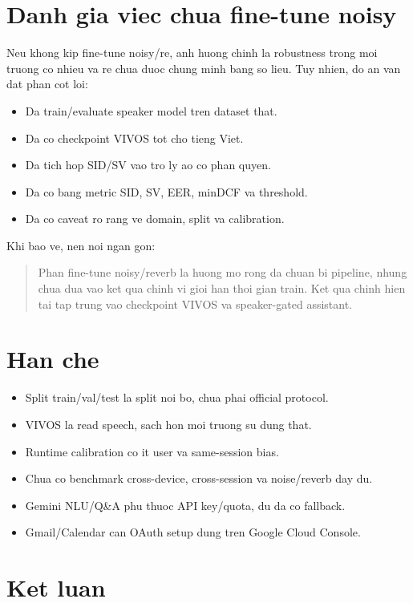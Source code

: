 \documentclass[12pt,a4paper]{article}
\begin{document}
\section{Danh gia viec chua fine-tune noisy}

Neu khong kip fine-tune noisy/re, anh huong chinh la robustness trong moi truong
co nhieu va re chua duoc chung minh bang so lieu. Tuy nhien, do an van dat phan
cot loi:

\begin{itemize}
  \item Da train/evaluate speaker model tren dataset that.
  \item Da co checkpoint VIVOS tot cho tieng Viet.
  \item Da tich hop SID/SV vao tro ly ao co phan quyen.
  \item Da co bang metric SID, SV, EER, minDCF va threshold.
  \item Da co caveat ro rang ve domain, split va calibration.
\end{itemize}

Khi bao ve, nen noi ngan gon:

\begin{quote}
Phan fine-tune noisy/reverb la huong mo rong da chuan bi pipeline, nhung chua
dua vao ket qua chinh vi gioi han thoi gian train. Ket qua chinh hien tai tap
trung vao checkpoint VIVOS va speaker-gated assistant.
\end{quote}

\section{Han che}

\begin{itemize}
  \item Split train/val/test la split noi bo, chua phai official protocol.
  \item VIVOS la read speech, sach hon moi truong su dung that.
  \item Runtime calibration co it user va same-session bias.
  \item Chua co benchmark cross-device, cross-session va noise/reverb day du.
  \item Gemini NLU/Q\&A phu thuoc API key/quota, du da co fallback.
  \item Gmail/Calendar can OAuth setup dung tren Google Cloud Console.
\end{itemize}

\section{Ket luan}
\end{document}
